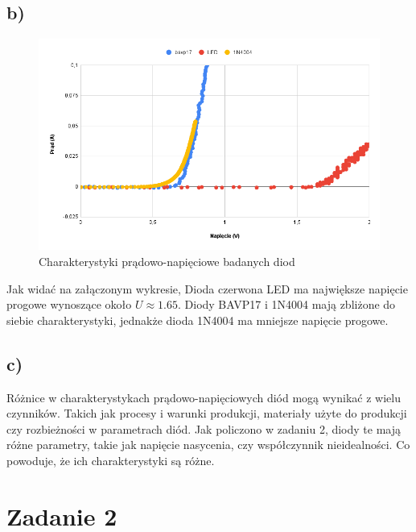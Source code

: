 \documentclass{article}
\begin{document}
\subsection{b)} 
\centering
\begin{figure}[h]
  \includegraphics[scale=0.5]{./img/chart.png}
  \caption{Charakterystyki prądowo-napięciowe badanych diod}
\end{figure}
Jak widać na załączonym wykresie, Dioda czerwona LED ma największe napięcie progowe wynoszące około $U \approx 1.65$. Diody BAVP17 i 1N4004 mają zbliżone do siebie charakterystyki, 
jednakże dioda 1N4004 ma mniejsze napięcie progowe. 
\raggedright
\subsection{c)}
\centering
Różnice w charakterystykach prądowo-napięciowych diód mogą wynikać z wielu czynników. Takich jak procesy i warunki produkcji, materiały użyte do produkcji czy rozbieżności w parametrach diód. 
Jak policzono w zadaniu 2, diody te mają różne parametry, takie jak napięcie nasycenia, czy współczynnik nieidealności. Co powoduje, że ich charakterystyki są różne.
\raggedright
\section{Zadanie 2}
\centering
\end{document}
